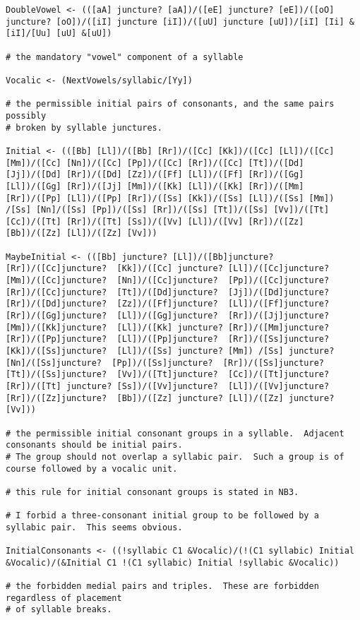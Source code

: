 \documentclass[12pt]{book}
\begin{document}
{\begin{verbatim}
DoubleVowel <- (([aA] juncture? [aA])/([eE] juncture? [eE])/([oO] juncture? [oO])/([iI] juncture [iI])/([uU] juncture [uU])/[iI] [Ii] &[iI]/[Uu] [uU] &[uU])

# the mandatory "vowel" component of a syllable

Vocalic <- (NextVowels/syllabic/[Yy])

# the permissible initial pairs of consonants, and the same pairs possibly
# broken by syllable junctures.

Initial <- (([Bb] [Ll])/([Bb] [Rr])/([Cc] [Kk])/([Cc] [Ll])/([Cc] [Mm])/([Cc] [Nn])/([Cc] [Pp])/([Cc] [Rr])/([Cc] [Tt])/([Dd] [Jj])/([Dd] [Rr])/([Dd] [Zz])/([Ff] [Ll])/([Ff] [Rr])/([Gg] [Ll])/([Gg] [Rr])/([Jj] [Mm])/([Kk] [Ll])/([Kk] [Rr])/([Mm] [Rr])/([Pp] [Ll])/([Pp] [Rr])/([Ss] [Kk])/([Ss] [Ll])/([Ss] [Mm]) /[Ss] [Nn]/([Ss] [Pp])/([Ss] [Rr])/([Ss] [Tt])/([Ss] [Vv])/([Tt] [Cc])/([Tt] [Rr])/([Tt] [Ss])/([Vv] [Ll])/([Vv] [Rr])/([Zz] [Bb])/([Zz] [Ll])/([Zz] [Vv]))

MaybeInitial <- (([Bb] juncture? [Ll])/([Bb]juncture?  [Rr])/([Cc]juncture?  [Kk])/([Cc] juncture? [Ll])/([Cc]juncture?  [Mm])/([Cc]juncture?  [Nn])/([Cc]juncture?  [Pp])/([Cc]juncture?  [Rr])/([Cc]juncture?  [Tt])/([Dd]juncture?  [Jj])/([Dd]juncture?  [Rr])/([Dd]juncture?  [Zz])/([Ff]juncture?  [Ll])/([Ff]juncture?  [Rr])/([Gg]juncture?  [Ll])/([Gg]juncture?  [Rr])/([Jj]juncture?  [Mm])/([Kk]juncture?  [Ll])/([Kk] juncture? [Rr])/([Mm]juncture?  [Rr])/([Pp]juncture?  [Ll])/([Pp]juncture?  [Rr])/([Ss]juncture?  [Kk])/([Ss]juncture?  [Ll])/([Ss] juncture? [Mm]) /[Ss] juncture? [Nn]/([Ss]juncture?  [Pp])/([Ss]juncture?  [Rr])/([Ss]juncture?  [Tt])/([Ss]juncture?  [Vv])/([Tt]juncture?  [Cc])/([Tt]juncture?  [Rr])/([Tt] juncture? [Ss])/([Vv]juncture?  [Ll])/([Vv]juncture?  [Rr])/([Zz]juncture?  [Bb])/([Zz] juncture? [Ll])/([Zz] juncture? [Vv]))

# the permissible initial consonant groups in a syllable.  Adjacent consonants should be initial pairs.
# The group should not overlap a syllabic pair.  Such a group is of course followed by a vocalic unit.

# this rule for initial consonant groups is stated in NB3.

# I forbid a three-consonant initial group to be followed by a syllabic pair.  This seems obvious.

InitialConsonants <- ((!syllabic C1 &Vocalic)/(!(C1 syllabic) Initial &Vocalic)/(&Initial C1 !(C1 syllabic) Initial !syllabic &Vocalic))

# the forbidden medial pairs and triples.  These are forbidden regardless of placement
# of syllable breaks.


\end{verbatim}}
\end{document}
